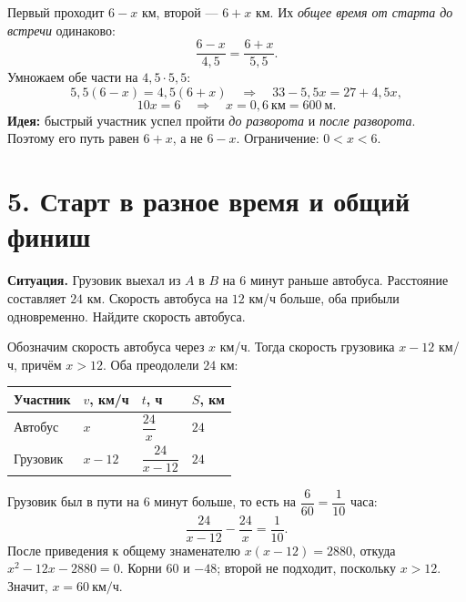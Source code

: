 \documentclass[a4paper,12pt]{article}
\newcommand{\key}[1]{\textcolor{darkaccent}{\textbf{#1}}}
\begin{document}
\begin{center}
\end{center}

Первый проходит $6-x$ км, второй --- $6+x$ км. Их \emph{общее время от старта до встречи} одинаково:
\[
\frac{6-x}{4{,}5}=\frac{6+x}{5{,}5}.
\]
Умножаем обе части на $4{,}5\cdot5{,}5$:
\[
5{,}5(6-x)=4{,}5(6+x)\quad\Longrightarrow\quad 33-5{,}5x=27+4{,}5x,
\]
\[
10x=6\quad\Longrightarrow\quad \boxed{x=0{,}6\ \text{км}=600\ \text{м}}.
\]
\key{Идея:} быстрый участник успел пройти \emph{до разворота} и \emph{после разворота}. Поэтому его путь равен $6+x$, а не $6-x$. Ограничение: $0<x<6$.

\clearpage
\section*{5. Старт в разное время и общий финиш}

\textbf{Ситуация.} Грузовик выехал из $A$ в $B$ на $6$ минут раньше автобуса. Расстояние составляет $24$ км. Скорость автобуса на $12$ км/ч больше, оба прибыли одновременно. Найдите скорость автобуса.

Обозначим скорость автобуса через $x$ км/ч. Тогда скорость грузовика $x-12$ км/ч, причём $x>12$. Оба преодолели $24$ км:
\begin{center}
\renewcommand{\arraystretch}{1.35}
\begin{tabularx}{\linewidth}{@{}lXXX@{}}
\toprule
Участник & $v$, км/ч & $t$, ч & $S$, км\\
\midrule
Автобус & $x$ & $\dfrac{24}{x}$ & $24$\\
Грузовик & $x-12$ & $\dfrac{24}{x-12}$ & $24$\\
\bottomrule
\end{tabularx}
\end{center}

Грузовик был в пути на $6$ минут больше, то есть на $\dfrac{6}{60}=\dfrac1{10}$ часа:
\[
\frac{24}{x-12}-\frac{24}{x}=\frac1{10}.
\]
После приведения к общему знаменателю $x(x-12)=2880$, откуда $x^2-12x-2880=0$. Корни $60$ и $-48$; второй не подходит, поскольку $x>12$. Значит, $\boxed{x=60\ \text{км/ч}}$.
\end{document}
